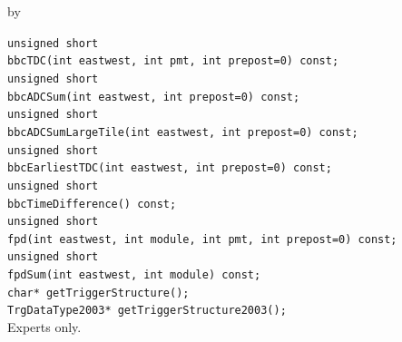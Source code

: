 \documentclass[twoside]{article}
\newcommand{\entrylabel}[1]{\mbox{\textbf{{#1}}}\hfil}%
\newenvironment{entry}
{\begin{list}{}%
    {\renewcommand{\makelabel}{\entrylabel}%
     \setlength{\labelwidth}{90pt}%
     \setlength{\leftmargin}{\labelwidth}
     \advance\leftmargin by \labelsep%
      }%
    }%
  {\end{list}}
\newcommand{\Entrylabel}[1]%
{\raisebox{0pt}[1ex][0pt]{\makebox[\labelwidth][l]%
    {\parbox[t]{\labelwidth}{\hspace{0pt}\textbf{{#1}}}}}}
\newenvironment{Entry}%
{\renewcommand{\entrylabel}{\Entrylabel}\begin{entry}}%
  {\end{entry}}
\begin{document}
\begin{Entry}
    \verb+unsigned short+\\
    \verb+bbcTDC(int eastwest, int pmt, int prepost=0) const;+\\

    \verb+unsigned short+\\
    \verb+bbcADCSum(int eastwest, int prepost=0) const;+\\

    \verb+unsigned short+\\
    \verb+bbcADCSumLargeTile(int eastwest, int prepost=0) const;+\\

    \verb+unsigned short+\\
    \verb+bbcEarliestTDC(int eastwest, int prepost=0) const;+\\

    \verb+unsigned short+\\
    \verb+bbcTimeDifference() const;+\\

    \verb+unsigned short+\\
    \verb+fpd(int eastwest, int module, int pmt, int prepost=0) const; +\\

    \verb+unsigned short+\\
    \verb+fpdSum(int eastwest, int module) const;+\\
    
    \verb+char* getTriggerStructure();+\\
    \verb+TrgDataType2003* getTriggerStructure2003(); +\\
    Experts only.
\end{Entry}
\clearpage 
\end{document}
